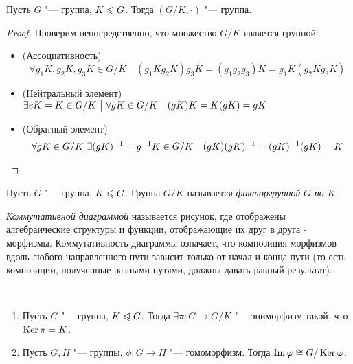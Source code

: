 \begin{proposition}
	Пусть $G$ "--- группа, $K \trianglelefteqslant G$. Тогда $(G / K, \cdot)$ "--- группа.
\end{proposition}

\begin{proof}
	Проверим непосредственно, что множество $G / K$ является группой:
	\begin{itemize}
		\item (Ассоциативность) \[
			\forall g_1K, g_2K, g_3K \in G / K \quad (g_1Kg_2K)g_3K = (g_1g_2g_3)K = g_1K(g_2Kg_3K)
		\]
		\item (Нейтральный элемент) \(
			\exists eK = K \in G / K \ \big|\  \forall gK \in G / K \quad (gK)K = K(gK) = gK
		\)
		\item (Обратный элемент) \[
			\forall gK \in G / K\ \exists (gK)^{-1} = g^{-1}K \in G / K \such (gK)(gK)^{-1} \hm= (gK)^{-1}(gK) = K
		\]
	\end{itemize}
\end{proof}

\begin{definition}
	Пусть $G$ "--- группа, $K \trianglelefteqslant G$. Группа $G / K$ называется \textit{факторгруппой} $G$ \textit{по} $K$.
\end{definition}

\begin{definition}
	\textit{Коммутативной диаграммой} называется рисунок, где отображены алгебраические структуры и функции, отображающие их друг в друга - морфизмы. Коммутативность диаграммы означает, что композиция морфизмов вдоль любого направленного пути зависит только от начал и конца пути (то есть композиции, полученные разными путями, должны давать равный результат).
\end{definition}

\begin{theorem}~
	\begin{enumerate}
		\item Пусть $G$ "--- группа, $K \trianglelefteqslant G$. Тогда $\exists \pi: G \to G / K$ "--- эпиморфизм такой, что $\ke\pi \hm= K$.
		\item Пусть $G, H$ "--- группы, $\phi: G \to H$ "--- гомоморфизм. Тогда $\operatorname{Im} \varphi \cong G / \operatorname{Ker} \varphi$.
	\end{enumerate}
\end{theorem}

